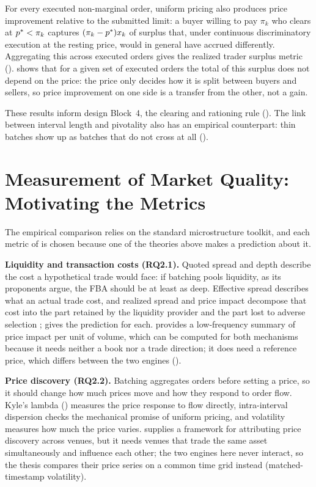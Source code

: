 For every executed non-marginal order, uniform pricing also produces price
improvement relative to the submitted limit: a buyer willing to pay
$\pi_k$ who clears at $p^{\ast} < \pi_k$ captures $(\pi_k - p^{\ast}) x_k$ of
surplus that, under continuous discriminatory execution at the resting
price, would in general have accrued differently. Aggregating this across
executed orders gives the realized trader surplus metric
().  shows that for a given
set of executed orders the total of this surplus does not depend on the
price: the price only decides how it is split between buyers and sellers,
so price improvement on one side is a transfer from the other, not a gain.

These results inform design Block~4, the clearing and rationing rule
(). The link between interval length and pivotality
also has an empirical counterpart: thin batches show up as batches that
do not cross at all ().

\section{Measurement of Market Quality: Motivating the Metrics}
\label{sec:quality}

The empirical comparison relies on the standard microstructure toolkit,
and each metric of  is chosen because one of the
theories above makes a prediction about it.

\textbf{Liquidity and transaction costs (RQ2.1).} Quoted spread and depth
describe the cost a hypothetical trade would face: if batching pools
liquidity, as its proponents argue, the FBA should be at least as deep.
Effective spread describes what an actual trade cost, and realized spread
and price impact decompose that cost into the part retained by the
liquidity provider and the part lost to adverse selection
\citep{hasbrouck1993assessing};  gives the
prediction for each. \citet{amihud2002illiquidity} provides a
low-frequency summary of price impact per unit of volume, which can be
computed for both mechanisms because it needs neither a book nor a trade
direction; it does need a reference price, which differs between the two
engines ().

\textbf{Price discovery (RQ2.2).} Batching aggregates orders before
setting a price, so it should change how much prices move and how they
respond to order flow. Kyle's lambda () measures the
price response to flow directly, intra-interval dispersion checks the
mechanical promise of uniform pricing, and volatility measures how much
the price varies. \citet{hasbrouck1995onesecurity} supplies a framework
for attributing price discovery across venues, but it needs venues that
trade the same asset simultaneously and influence each other; the two
engines here never interact, so the thesis compares their price series on
a common time grid instead (matched-timestamp volatility).


